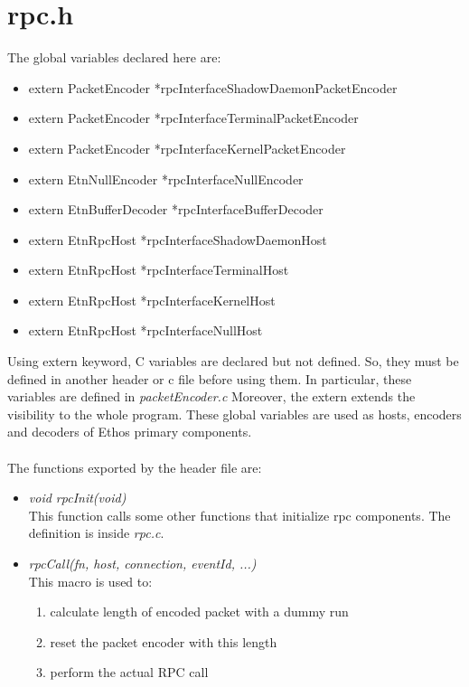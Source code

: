 \section{rpc.h}

The global variables declared here are:
\begin{itemize}
\item extern PacketEncoder *rpcInterfaceShadowDaemonPacketEncoder
\item extern PacketEncoder *rpcInterfaceTerminalPacketEncoder
\item extern PacketEncoder *rpcInterfaceKernelPacketEncoder
\item extern EtnNullEncoder *rpcInterfaceNullEncoder
\item extern EtnBufferDecoder *rpcInterfaceBufferDecoder
\item extern EtnRpcHost *rpcInterfaceShadowDaemonHost
\item extern EtnRpcHost *rpcInterfaceTerminalHost
\item extern EtnRpcHost *rpcInterfaceKernelHost
\item extern EtnRpcHost *rpcInterfaceNullHost
\end{itemize}
Using extern keyword, C variables are declared but not defined. So, they must be defined in another header or c file before using them. In particular, these variables are defined in \emph{packetEncoder.c}
Moreover, the extern extends the visibility to the whole program. These global variables are used as hosts, encoders and decoders of Ethos primary components.\\\\
The functions exported by the header file are:

\begin{itemize}
\item \emph{void rpcInit(void)}\\
This function calls some other functions that initialize rpc components. The definition is inside \emph{rpc.c}.

\item \emph{rpcCall(fn, host, connection, eventId, ...)}\\
This macro is used to: 
\begin{enumerate}

\item calculate length of encoded packet with a dummy run
\item reset the packet encoder with this length
\item perform the actual RPC call

\end{enumerate}

\end{itemize}